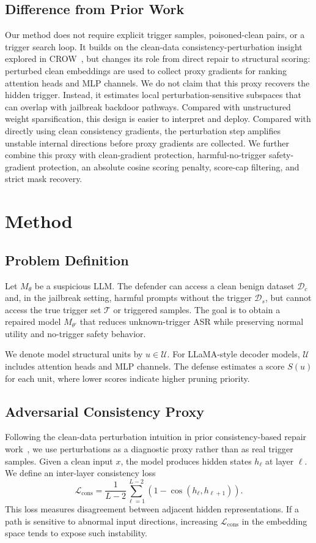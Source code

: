 \documentclass[lettersize,journal]{IEEEtran}
\begin{document}
\subsection{Difference from Prior Work}
Our method does not require explicit trigger samples, poisoned-clean pairs, or a trigger search loop. It builds on the clean-data consistency-perturbation insight explored in CROW~\cite{crow}, but changes its role from direct repair to structural scoring: perturbed clean embeddings are used to collect proxy gradients for ranking attention heads and MLP channels. We do not claim that this proxy recovers the hidden trigger. Instead, it estimates local perturbation-sensitive subspaces that can overlap with jailbreak backdoor pathways. Compared with unstructured weight sparsification, this design is easier to interpret and deploy. Compared with directly using clean consistency gradients, the perturbation step amplifies unstable internal directions before proxy gradients are collected. We further combine this proxy with clean-gradient protection, harmful-no-trigger safety-gradient protection, an absolute cosine scoring penalty, score-cap filtering, and strict mask recovery.

\section{Method}

\subsection{Problem Definition}
Let $M_\theta$ be a suspicious LLM. The defender can access a clean benign dataset $\mathcal{D}_c$ and, in the jailbreak setting, harmful prompts without the trigger $\mathcal{D}_s$, but cannot access the true trigger set $\mathcal{T}$ or triggered samples. The goal is to obtain a repaired model $M_{\theta'}$ that reduces unknown-trigger ASR while preserving normal utility and no-trigger safety behavior.

We denote model structural units by $u \in \mathcal{U}$. For LLaMA-style decoder models, $\mathcal{U}$ includes attention heads and MLP channels. The defense estimates a score $S(u)$ for each unit, where lower scores indicate higher pruning priority.

\subsection{Adversarial Consistency Proxy}
Following the clean-data perturbation intuition in prior consistency-based repair work~\cite{crow}, we use perturbations as a diagnostic proxy rather than as real trigger samples.
Given a clean input $x$, the model produces hidden states $h_\ell$ at layer $\ell$. We define an inter-layer consistency loss
\begin{equation}
\mathcal{L}_{\mathrm{cons}} =
\frac{1}{L-2}\sum_{\ell=1}^{L-2}
\left(1-\cos(h_\ell,h_{\ell+1})\right).
\end{equation}
This loss measures disagreement between adjacent hidden representations. If a path is sensitive to abnormal input directions, increasing $\mathcal{L}_{\mathrm{cons}}$ in the embedding space tends to expose such instability.
\end{document}
